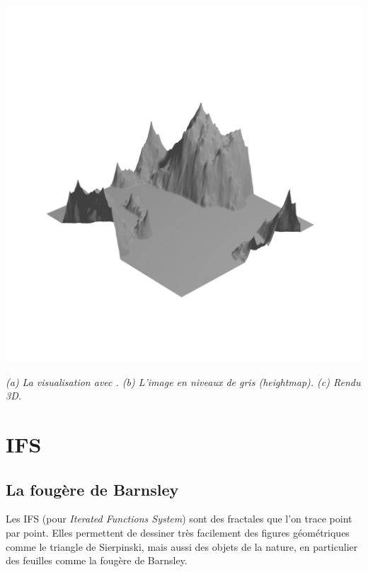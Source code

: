 \documentclass[11pt,class=report,crop=false]{standalone}
\begin{document}
\begin{exemple}
\begin{center}
\includegraphics[scale=\myscale,scale=0.25]{figures/hauteurs-render-new-02}

\smallskip

\nopagebreak

\begin{minipage}{0.8\textwidth}
\center\emph{
(a) La visualisation \Python{} avec \matplotlib.
(b) L'image en niveaux de gris (\emph{heightmap}).
(c) Rendu 3D.}
\end{minipage}

\end{center}


\end{exemple}

\section{IFS}


\subsection{La fougère de Barnsley}

Les IFS (pour \emph{Iterated Functions System}) sont des fractales que l'on trace point par point. Elles permettent de dessiner très facilement des figures géométriques comme le triangle de Sierpinski, mais aussi des objets de la nature, en particulier des feuilles comme la fougère de Barnsley.
\end{document}
